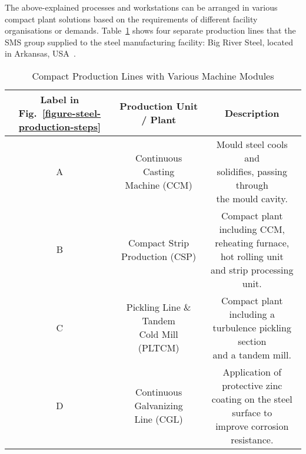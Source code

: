 

The above-explained processes and workstations can be arranged in various compact plant solutions based on the requirements of different facility organisations or demands. Table~\ref{Tab: production_lines} shows four separate production lines that the SMS group supplied to the steel manufacturing facility: Big River Steel, located in Arkansas, USA~\cite{BRS}.
\begin{table}[ht!]
	\centering
	\setlength{\arrayrulewidth}{0.75pt}%
	\caption{Compact Production Lines with Various Machine Modules}
	\begin{tabular}{|c|c|c|}
		\hline
		\rowcolor[HTML]{FFFFC7} 
		\makecell{Label in\\Fig.~\ref{figure-steel-production-steps}} & Production Unit / Plant                       & Description                                                                                    \\ \hline
		A               & \makecell{Continuous Casting\\Machine (CCM)}            & \makecell{Mould steel cools and \\  solidifies, passing through \\the mould cavity.}                          \\ \hline
		B               & \makecell{Compact Strip \\Production (CSP)}              &\makecell{Compact plant including CCM,\\   reheating furnace, hot rolling unit \\and strip processing unit.}       \\ \hline
		C               & \makecell{Pickling Line \& Tandem \\Cold Mill (PLTCM)} & \makecell{Compact plant including a\\   turbulence pickling section \\and a tandem mill.}                     \\ \hline
		D               & \makecell{Continuous Galvanizing \\Line   (CGL)}         & \makecell{Application of protective zinc \\  coating on the steel surface to \\improve corrosion resistance.} \\ \hline
	\end{tabular}
	\label{Tab: production_lines}
\end{table}

